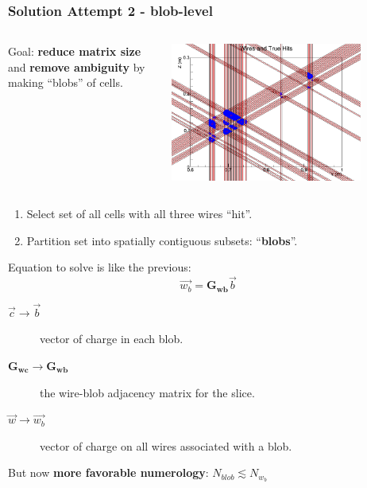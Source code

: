 \documentclass[xcolor=dvipsnames]{beamer}
\begin{document}
\begin{frame}
  \frametitle{Solution Attempt 2 - blob-level}
  \vspace{-10mm}
  \begin{columns}
    \begin{column}{0.6\textwidth}
      Goal: \textbf{reduce matrix size} and \textbf{remove ambiguity} by making ``blobs'' of cells.
    \end{column}
    \begin{column}{0.4\textwidth}
      \includegraphics[width=0.8\textwidth]{wires-and-true-hits.png}          
    \end{column}
  \end{columns}
      
  \begin{enumerate}
  \item Select set of all cells with all three wires ``hit''.
  \item Partition set into spatially contiguous subsets: ``\textbf{blobs}''.
  \end{enumerate}
  Equation to solve is like the previous:
  \[\vec{w_b} = \mathbf{G_{wb}} \vec{b}\]

  \begin{description}
  \item[$\vec{c} \to \vec{b}$] vector of charge in each blob.
  \item[$\mathbf{G_{wc}} \to \mathbf{G_{wb}}$] the wire-blob adjacency matrix for the slice.
  \item[$\vec{w} \to \vec{w_b}$] vector of charge on all wires associated with a blob.
  \end{description}
  But now \textbf{more favorable numerology}: $N_{blob} \lesssim N_{w_b}$
\end{frame}
\end{document}
